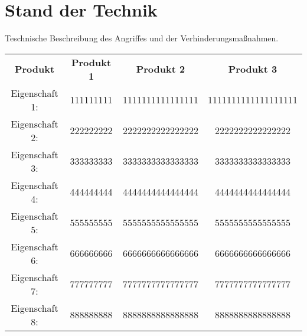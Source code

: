 \section{Stand der Technik}

Teschnische Beschreibung des Angriffes und der Verhinderungsmaßnahmen.


\begin {table}
\centering
\begin{tabular}{c|c|c|c}
    \textbf{Produkt} & \textbf{Produkt 1} & \textbf{Produkt 2} & \textbf{Produkt 3} \\
    Eigenschaft 1:   & 111111111          &  1111111111111111  &  1111111111111111111 \\
    Eigenschaft 2:   & 222222222          &  2222222222222222  &  2222222222222222 \\
    Eigenschaft 3:   & 333333333          &  3333333333333333  &  3333333333333333 \\
    Eigenschaft 4:   & 444444444          &  4444444444444444  &  4444444444444444 \\
    Eigenschaft 5:   & 555555555          &  5555555555555555  &  5555555555555555 \\
    Eigenschaft 6:   & 666666666          &  6666666666666666  &  6666666666666666 \\
    Eigenschaft 7:   & 777777777          &  7777777777777777  &  7777777777777777 \\
    Eigenschaft 8:   & 888888888          &  8888888888888888  &  8888888888888888 \\

\end{tabular}
\end {table}